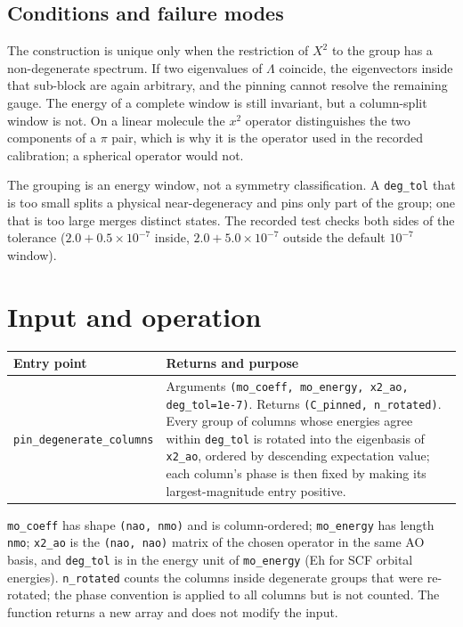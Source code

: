 \subsection{Conditions and failure modes}

The construction is unique only when the restriction of $X^{2}$ to the
group has a non-degenerate spectrum.  If two eigenvalues of
$\Lambda$ coincide, the eigenvectors inside that sub-block are again
arbitrary, and the pinning cannot resolve the remaining gauge.  The
energy of a complete window is still invariant, but a column-split
window is not.  On a linear molecule the $x^{2}$ operator distinguishes
the two components of a $\pi$ pair, which is why it is the operator
used in the recorded calibration; a spherical operator would not.

The grouping is an energy window, not a symmetry classification.  A
\texttt{deg\_tol} that is too small splits a physical near-degeneracy
and pins only part of the group; one that is too large merges distinct
states.  The recorded test checks both sides of the tolerance
($2.0+0.5\times10^{-7}$ inside, $2.0+5.0\times10^{-7}$ outside the
default $10^{-7}$ window).

\section{Input and operation}
\label{sec:pin-input}

\begin{center}
\small
\begin{tabularx}{\textwidth}{>{\raggedright\arraybackslash}p{}X}
\toprule
Entry point & Returns and purpose \\
\midrule
\texttt{pin\_degenerate\_columns} &
  Arguments \texttt{(mo\_coeff, mo\_energy, x2\_ao, deg\_tol=1e-7)}.
  Returns \texttt{(C\_pinned, n\_rotated)}.  Every group of columns
  whose energies agree within \texttt{deg\_tol} is rotated into the
  eigenbasis of \texttt{x2\_ao}, ordered by descending expectation
  value; each column's phase is then fixed by making its
  largest-magnitude entry positive. \\
\bottomrule
\end{tabularx}
\end{center}

\texttt{mo\_coeff} has shape \texttt{(nao, nmo)} and is column-ordered;
\texttt{mo\_energy} has length \texttt{nmo}; \texttt{x2\_ao} is the
\texttt{(nao, nao)} matrix of the chosen operator in the same AO basis,
and \texttt{deg\_tol} is in the energy unit of \texttt{mo\_energy}
(Eh for SCF orbital energies).  \texttt{n\_rotated} counts the columns
inside degenerate groups that were re-rotated; the phase convention is
applied to all columns but is not counted.  The function returns a new
array and does not modify the input.

